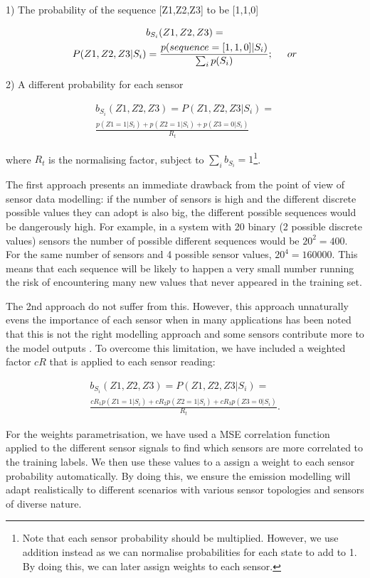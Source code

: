 \documentclass[conference]{IEEEtran}
\begin{document}
1) The probability of the sequence [Z1,Z2,Z3] to be [1,1,0]

\begin{gather*} 
 b_{S_i}(Z1,Z2,Z3)=\\
P(Z1,Z2,Z3|S_i)=\frac{p(sequence=[1,1,0]|S_i)}{\sum_{i}^{ } p(S_i)};\hspace{0.5cm}or
\end{gather*}

2) A different probability for each sensor

\begin{gather*} 
b_{S_i}(Z1,Z2,Z3)=P(Z1,Z2,Z3|S_i)=\\
\frac{p(Z1=1|S_i)+p(Z2=1|S_i)+p(Z3=0|S_i)}{R_t}
\end{gather*}

where $R_t$ is the normalising factor, subject to $\sum_{i}^{ }b_{S_i}=1$\footnote{Note that each sensor probability should be multiplied. However, we use addition instead as we can normalise probabilities for each state to add to 1. By doing this, we can later assign weights to each sensor.}.

The first approach presents an immediate drawback from the point of view of sensor data modelling: if the number of sensors is high and the different discrete possible values they can adopt is also big, the different possible sequences would be dangerously high. For example, in a system with 20 binary (2 possible discrete values) sensors the number of possible different sequences would be $20^2=400$. For the same number of sensors and 4 possible sensor values, $20^4=160000$. This means that each sequence will be likely to happen a very small number running the risk of encountering many new values that never appeared in the training set.

The 2nd approach do not suffer from this. However, this approach unnaturally evens the importance of each sensor when in many applications has been noted that this is not the right modelling approach and some sensors contribute more to the model outputs \cite{Dong2009a}. To overcome this limitation, we have included a weighted factor $cR$ that is applied to each sensor reading: 

\begin{gather*} 
b_{S_i}(Z1,Z2,Z3)=P(Z1,Z2,Z3|S_i)=\\
\frac{cR_1p(Z1=1|S_i)+cR_2p(Z2=1|S_i)+cR_3p(Z3=0|S_i)}{R_t}.
\end{gather*}

For the weights parametrisation, we have used a MSE correlation function applied to the different sensor signals to find which sensors are more correlated to the training labels. We then use these values to a assign a weight to each sensor probability automatically. By doing this, we ensure the emission modelling will adapt realistically to different scenarios with various sensor topologies and sensors of diverse nature. 
\end{document}
